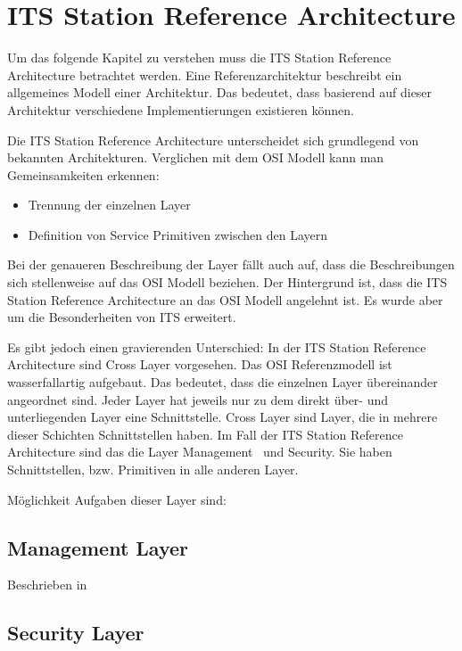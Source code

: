 \section{ITS Station Reference Architecture}
Um das folgende Kapitel zu verstehen muss die \ac{ITS} Station Reference Architecture betrachtet werden. Eine Referenzarchitektur beschreibt ein allgemeines Modell einer Architektur. Das bedeutet, dass basierend auf dieser Architektur verschiedene Implementierungen existieren können. 

Die \ac{ITS} Station Reference Architecture unterscheidet sich grundlegend von bekannten Architekturen. Verglichen mit dem \ac{OSI} Modell kann man Gemeinsamkeiten erkennen:
\begin{itemize}
	\item Trennung der einzelnen Layer
	\item Definition von Service Primitiven zwischen den Layern
\end{itemize}

Bei der genaueren Beschreibung der Layer fällt auch auf, dass die Beschreibungen sich stellenweise auf das \ac{OSI} Modell beziehen. Der Hintergrund ist, dass die \ac{ITS} Station Reference Architecture an das \ac{OSI} Modell angelehnt ist. Es wurde aber um die Besonderheiten von \ac{ITS} erweitert.

Es gibt jedoch einen gravierenden Unterschied: In der \ac{ITS} Station Reference Architecture sind Cross Layer vorgesehen. Das \ac{OSI} Referenzmodell ist wasserfallartig aufgebaut. Das bedeutet, dass die einzelnen Layer übereinander angeordnet sind. Jeder Layer hat jeweils nur zu dem direkt über- und unterliegenden Layer eine Schnittstelle. Cross Layer sind Layer, die in mehrere dieser Schichten Schnittstellen haben. Im Fall der \ac{ITS} Station Reference Architecture sind das die Layer \glqq Management\grqq~ und \glqq Security\grqq. Sie haben Schnittstellen, bzw. Primitiven in alle anderen Layer. 

Möglichkeit Aufgaben dieser Layer sind:
\subsection{Management Layer}
Beschrieben in \cite{etsi1027232}

\subsection{Security Layer}

